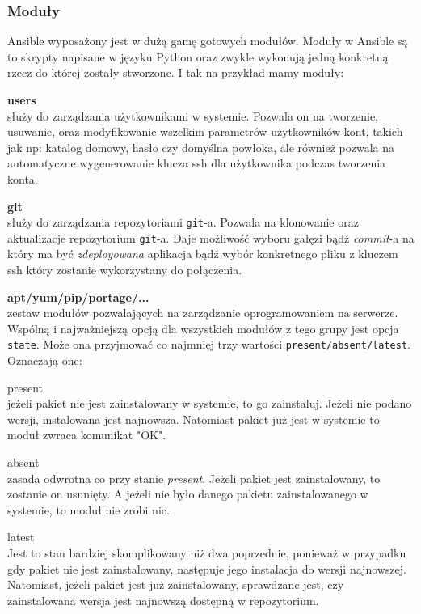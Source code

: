 \subsubsection{Moduły}
Ansible wyposażony jest w dużą gamę gotowych modułów.
Moduły w Ansible są to skrypty napisane w języku Python oraz zwykle wykonują jedną konkretną rzecz do której zostały stworzone.
I tak na przykład mamy moduły:
\begin{description}
	\item{\textbf{users}}\\
		służy do zarządzania użytkownikami w systemie. Pozwala on na tworzenie, usuwanie, oraz modyfikowanie wszelkim parametrów użytkowników kont, takich jak np: katalog domowy, hasło czy domyślna powłoka, ale również pozwala na automatyczne wygenerowanie klucza ssh dla użytkownika podczas tworzenia konta.
	\item{\textbf{git}}\\
		służy do zarządzania repozytoriami \texttt{git}-a. Pozwala na klonowanie oraz aktualizacje repozytorium \texttt{git}-a. Daje możliwość wyboru gałęzi bądź \textit{commit}-a na który ma być \textit{zdeployowana} aplikacja bądź wybór konkretnego pliku z kluczem ssh który zostanie wykorzystany do połączenia.
	\item{\textbf{apt/yum/pip/portage/...}}\\
		zestaw modułów pozwalających na zarządzanie oprogramowaniem na serwerze. Wspólną i najważniejszą opcją dla wszystkich modułów z tego grupy jest opcja \texttt{state}. Może ona przyjmować co najmniej trzy wartości \texttt{present/absent/latest}. Oznaczają one:
		\begin{description}
			\item{present}\\
				jeżeli pakiet nie jest zainstalowany w systemie, to go zainstaluj. Jeżeli nie podano wersji, instalowana jest najnowsza.
				Natomiast pakiet już jest w systemie to moduł zwraca komunikat "OK".
			\item{absent}\\
				zasada odwrotna co przy stanie \textit{present}. Jeżeli pakiet jest zainstalowany, to zostanie on usunięty.
				A jeżeli nie było danego pakietu zainstalowanego w systemie, to moduł nie zrobi nic.
			\item{latest}\\
				Jest to stan bardziej skomplikowany niż dwa poprzednie, ponieważ w przypadku gdy pakiet nie jest zainstalowany, następuje jego instalacja do wersji najnowszej.
				Natomiast, jeżeli pakiet jest już zainstalowany, sprawdzane jest, czy zainstalowana wersja jest najnowszą dostępną w repozytorium.

\end{description}
\end{description}
